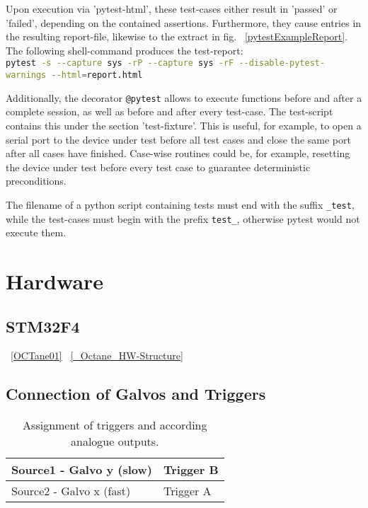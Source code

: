 		Upon execution via 'pytest-html', these test-cases either result in 'passed' or 'failed', depending on the contained assertions. Furthermore, they cause entries in the resulting report-file, likewise to the extract in fig. ~\ref{pytestExampleReport}. The following shell-command produces the test-report: \\
		\lstinline[language=bash]{pytest -s --capture sys -rP --capture sys -rF --disable-pytest-warnings --html=report.html} \\
			

		Additionally, the decorator \lstinline{@pytest} allows to execute functions before and after a complete session, as well as before and after every test-case. The test-script contains this under the section 'test-fixture'. This is useful, for example, to open a serial port to the device under test before all test cases and close the same port after all cases have finished. Case-wise routines could be, for example, resetting the device under test before every test case to guarantee deterministic preconditions.

		The filename of a python script containing tests must end with the suffix \lstinline{_test}, while the test-cases must begin with the prefix \lstinline{test_}, otherwise pytest would not execute them. %

	\section{Hardware}
		\subsection{STM32F4}
		
		
		~\ref{OCTane01}
		~\ref{_Octane_HW-Structure}
		
		\subsection{Connection of Galvos and Triggers}
			\begin{table}[h!]
				 \begin{tabular}{|p{5.5cm}|p{6cm}|} \hline
				Source1	- Galvo y (slow)& Trigger B\\ \hline
				Source2	- Galvo x (fast)& Trigger A\\ \hline
				 \end{tabular}
				 \caption{Assignment of triggers and according analogue outputs.}
			\end{table}

	
